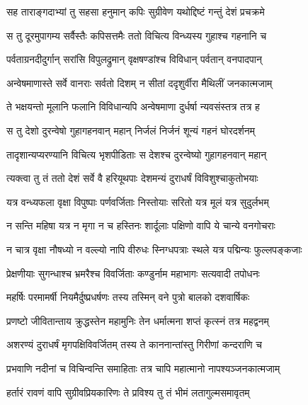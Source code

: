 
\twolineshloka
{सह ताराङ्गदाभ्यां तु सहसा हनुमान् कपिः}
{सुग्रीवेण यथोद्दिष्टं गन्तुं देशं प्रचक्रमे} %

\twolineshloka
{स तु दूरमुपागम्य सर्वैस्तैः कपिसत्तमैः}
{ततो विचित्य विन्ध्यस्य गुहाश्च गहनानि च} %

\twolineshloka
{पर्वताग्रनदीदुर्गान् सरांसि विपुलद्रुमान्}
{वृक्षषण्डांश्च विविधान् पर्वतान् वनपादपान्} %

\twolineshloka
{अन्वेषमाणास्ते सर्वे वानराः सर्वतो दिशम्}
{न सीतां ददृशुर्वीरा मैथिलीं जनकात्मजाम्} %

\twolineshloka
{ते भक्षयन्तो मूलानि फलानि विविधान्यपि}
{अन्वेषमाणा दुर्धर्षा न्यवसंस्तत्र तत्र ह} %

\twolineshloka
{स तु देशो दुरन्वेषो गुहागहनवान् महान्}
{निर्जलं निर्जनं शून्यं गहनं घोरदर्शनम्} %

\twolineshloka
{तादृशान्यप्यरण्यानि विचित्य भृशपीडिताः}
{स देशश्च दुरन्वेष्यो गुहागहनवान् महान्} %

\twolineshloka
{त्यक्त्वा तु तं ततो देशं सर्वे वै हरियूथपाः}
{देशमन्यं दुराधर्षं विविशुश्चाकुतोभयाः} %

\twolineshloka
{यत्र वन्ध्यफला वृक्षा विपुष्पाः पर्णवर्जिताः}
{निस्तोयाः सरितो यत्र मूलं यत्र सुदुर्लभम्} %

\twolineshloka
{न सन्ति महिषा यत्र न मृगा न च हस्तिनः}
{शार्दूलाः पक्षिणो वापि ये चान्ये वनगोचराः} %

\twolineshloka
{न चात्र वृक्षा नौषध्यो न वल्ल्यो नापि वीरुधः}
{स्निग्धपत्राः स्थले यत्र पद्मिन्यः फुल्लपङ्कजाः} %

\twolineshloka
{प्रेक्षणीयाः सुगन्धाश्च भ्रमरैश्च विवर्जिताः}
{कण्डुर्नाम महाभागः सत्यवादी तपोधनः} %

\twolineshloka
{महर्षिः परमामर्षी नियमैर्दुष्प्रधर्षणः}
{तस्य तस्मिन् वने पुत्रो बालको दशवार्षिकः} %

\twolineshloka
{प्रणष्टो जीवितान्ताय क्रुद्धस्तेन महामुनिः}
{तेन धर्मात्मना शप्तं कृत्स्नं तत्र महद्वनम्} %

\twolineshloka
{अशरण्यं दुराधर्षं मृगपक्षिविवर्जितम्}
{तस्य ते काननान्तांस्तु गिरीणां कन्दराणि च} %

\twolineshloka
{प्रभवाणि नदीनां च विचिन्वन्ति समाहिताः}
{तत्र चापि महात्मानो नापश्यञ्जनकात्मजाम्} %

\twolineshloka
{हर्तारं रावणं वापि सुग्रीवप्रियकारिणः}
{ते प्रविश्य तु तं भीमं लतागुल्मसमावृतम्} %

